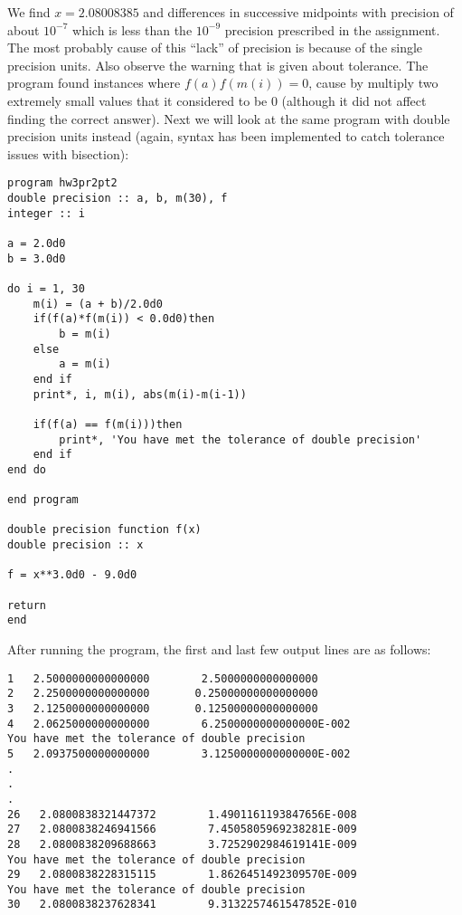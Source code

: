 \documentclass[12pt]{article}
\begin{document}
We find $x=2.08008385$ and differences in successive midpoints with precision of about $10^{-7}$ which is less than the $10^{-9}$ precision prescribed in the assignment. The most probably cause of this ``lack'' of precision is because of the single precision units. Also observe the warning that is given about tolerance. The program found instances where $f(a)f(m(i))=0$, cause by multiply two extremely small values that it considered to be 0 (although it did not affect finding the correct answer). Next we will look at the same program with double precision units instead (again, syntax has been implemented to catch tolerance issues with bisection):

\begin{verbatim}
program hw3pr2pt2
double precision :: a, b, m(30), f
integer :: i 

a = 2.0d0
b = 3.0d0

do i = 1, 30 
	m(i) = (a + b)/2.0d0
	if(f(a)*f(m(i)) < 0.0d0)then
		b = m(i)
	else
		a = m(i)
	end if
	print*, i, m(i), abs(m(i)-m(i-1))
	
	if(f(a) == f(m(i)))then
		print*, 'You have met the tolerance of double precision'
	end if 	
end do

end program

double precision function f(x)
double precision :: x

f = x**3.0d0 - 9.0d0

return
end
\end{verbatim}

After running the program, the first and last few output lines are as follows:

\begin{verbatim}
1   2.5000000000000000        2.5000000000000000
2   2.2500000000000000       0.25000000000000000
3   2.1250000000000000       0.12500000000000000
4   2.0625000000000000        6.2500000000000000E-002
You have met the tolerance of double precision
5   2.0937500000000000        3.1250000000000000E-002
.
.
.
26   2.0800838321447372        1.4901161193847656E-008
27   2.0800838246941566        7.4505805969238281E-009
28   2.0800838209688663        3.7252902984619141E-009
You have met the tolerance of double precision
29   2.0800838228315115        1.8626451492309570E-009
You have met the tolerance of double precision
30   2.0800838237628341        9.3132257461547852E-010
\end{verbatim}
\end{document}

